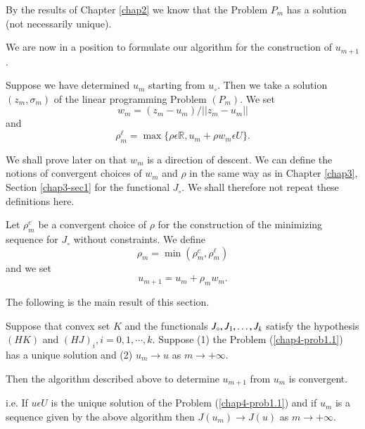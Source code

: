 By the results of Chapter \ref{chap2} we know that the Problem $P_{m}$ has a solution (not necessarily unique).

We are now in a position to formulate our algorithm for the construction of $u_{m+1}$.

\medskip
{}\pageoriginale
 Suppose we have determined $u_{m}$ starting from $u_{\circ}$. Then we take a solution $(z_{m}, \sigma_{m})$ of the linear programming Problem $(P_{m})$. We set
\begin{equation*}
w_{m} = (z_{m} - u_{m})/ ||z_{m} - u_{m}||\tag{1.3}\label{chap4-eq1.3}
\end{equation*}
and
\begin{equation*}
\rho_{m}^{\ell} = \max \{\rho \epsilon \mathbb{R}, u_{m} + \rho w_{m} \epsilon U\}.\tag{1.4}\label{chap4-eq1.4}
\end{equation*}

We shall prove later on that $w_{m}$ is a direction of descent. We can define the notions of convergent choices of $w_{m}$ and $\rho$ in the same way as in Chapter \ref{chap3}, Section \ref{chap3-sec1} for the functional $J_{\circ}$. We shall therefore not repeat these definitions here.

Let $\rho_{m}^{c}$ be a convergent choice of $\rho$ for the construction of the minimizing sequence for $J_{\circ}$ without constraints. We define
\begin{equation*}
\rho_{m} = \min (\rho_{m}^{c}, \rho_{m}^{\ell})\tag{1.5}\label{chap4-eq1.5}
\end{equation*}
and we set
\begin{equation*}
u_{m+1} = u_{m} + \rho_{m} w_{m}.\tag{1.6}\label{chap4-eq1.6}
\end{equation*}

The following is the main result of this section.

\begin{theorem}\label{chap4-thm1.1}
Suppose that convex set $K$ and the functionals $J_{\circ}, J_{1},\break \ldots, J_{k}$ satisfy the hypothesis $(HK)$ and $(HJ)_{i}, i = 0, 1, \cdots, k$. Suppose (1) the Problem (\ref{chap4-prob1.1}) has a unique solution and (2) $u_{m} \to u$ as $m \to + \infty$.
\end{theorem}

Then the algorithm described above to determine $u_{m+1}$ from $u_{m}$ is convergent.

i.e. If $u \epsilon U$ is the unique solution of the Problem (\ref{chap4-prob1.1}) and if $u_{m}$ is a sequence given by the above algorithm then $J(u_{m}) \to J(u)$ as $m \to + \infty$. 

